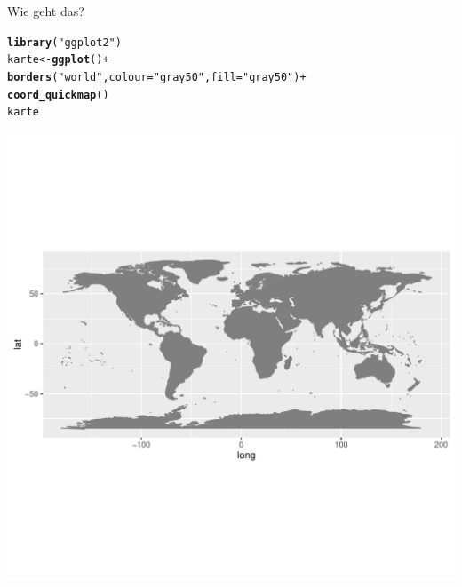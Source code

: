 \documentclass{beamer}\usepackage[]{graphicx}\usepackage[]{color}
\makeatletter
\newcommand{\hlstr}[1]{\textcolor[rgb]{0.192,0.494,0.8}{#1}}%
\newcommand{\hlopt}[1]{\textcolor[rgb]{0,0,0}{#1}}%
\newcommand{\hlstd}[1]{\textcolor[rgb]{0.345,0.345,0.345}{#1}}%
\newcommand{\hlkwb}[1]{\textcolor[rgb]{0.69,0.353,0.396}{#1}}%
\newcommand{\hlkwc}[1]{\textcolor[rgb]{0.333,0.667,0.333}{#1}}%
\newcommand{\hlkwd}[1]{\textcolor[rgb]{0.737,0.353,0.396}{\textbf{#1}}}%
\newenvironment{kframe}{%
 \def\at@end@of@kframe{}%
 \ifinner\ifhmode%
  \def\at@end@of@kframe{\end{minipage}}%
  \begin{minipage}{\columnwidth}%
 \fi\fi%
 \def\FrameCommand##1{\hskip\@totalleftmargin \hskip-\fboxsep
 \colorbox{shadecolor}{##1}\hskip-\fboxsep
     \hskip-\linewidth \hskip-\@totalleftmargin \hskip\columnwidth}%
 \MakeFramed {\advance\hsize-\width
   \@totalleftmargin\z@ \linewidth\hsize
   \@setminipage}}%
 {\par\unskip\endMakeFramed%
 \at@end@of@kframe}
\newenvironment{knitrout}{}{} %
\makeatother
\begin{document}
\begin{frame}[fragile]{Wie geht das?}
\small
\begin{knitrout}
\color{fgcolor}\begin{kframe}
\begin{alltt}
\hlkwd{library}\hlstd{(}\hlstr{"ggplot2"}\hlstd{)}
\hlstd{karte} \hlkwb{<-} \hlkwd{ggplot}\hlstd{()} \hlopt{+}
  \hlkwd{borders}\hlstd{(}\hlstr{"world"}\hlstd{,} \hlkwc{colour}\hlstd{=}\hlstr{"gray50"}\hlstd{,} \hlkwc{fill}\hlstd{=}\hlstr{"gray50"}\hlstd{)} \hlopt{+}
  \hlkwd{coord_quickmap}\hlstd{()}
\hlstd{karte}
\end{alltt}
\end{kframe}
\end{knitrout}
\includegraphics[width = \textwidth, trim={0 13em 0em 13em}, clip]{figure/karte-1}
\end{frame}
\end{document}
